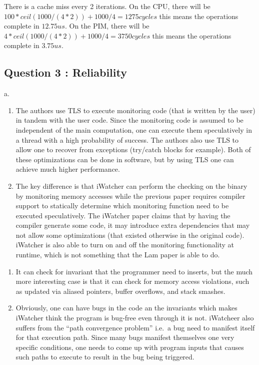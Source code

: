 There is a cache miss every 2 iterations. On the CPU, there will be
$100*ceil(1000/(4*2)) + 1000/4 = 1275cycles$ this means the operations
complete in $12.75us$. On the PIM, there will be
$4*ceil(1000/(4*2)) + 1000/4 = 3750cycles$ this means the operations
complete in $3.75us$.

\subsection{Question 3 : Reliability}\label{question-3-reliability}

a.

\begin{enumerate}
\def\labelenumi{\arabic{enumi}.}
\item
  The authors use TLS to execute monitoring code (that is written by the
  user) in tandem with the user code. Since the monitoring code is
  assumed to be independent of the main computation, one can execute
  them speculatively in a thread with a high probability of success. The
  authors also use TLS to allow one to recover from exceptions
  (try/catch blocks for example). Both of these optimizations can be
  done in software, but by using TLS one can achieve much higher
  performance.
\item
  The key difference is that iWatcher can perform the checking on the
  binary by monitoring memory accesses while the previous paper requires
  compiler support to statically determine which monitoring function
  need to be executed speculatively. The iWatcher paper claims that by
  having the compiler generate some code, it may introduce extra
  dependencies that may not allow some optimizations (that existed
  otherwise in the original code). iWatcher is also able to turn on and
  off the monitoring functionality at runtime, which is not something
  that the Lam paper is able to do.
\end{enumerate}

\begin{enumerate}
\def\labelenumi{\alph{enumi}.}
\setcounter{enumi}{1}
\item
  It can check for invariant that the programmer need to inserts, but
  the much more interesting case is that it can check for memory access
  violations, such as updated via aliased pointers, buffer overflows,
  and stack smashes.
\item
  Obviously, one can have bugs in the code an the invariants which makes
  iWatcher think the program is bug-free even through it is not.
  iWatcheer also suffers from the ``path convergence problem'' i.e.~a
  bug need to manifest itself for that execution path. Since many bugs
  manifest themselves one very specific conditions, one needs to come up
  with program inputs that causes such paths to execute to result in the
  bug being triggered.
\end{enumerate}
